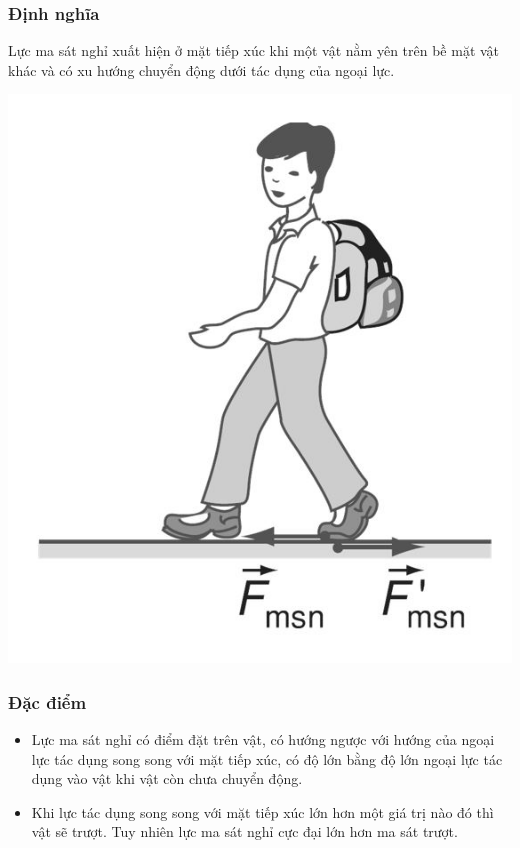 \subsubsection{Định nghĩa}
Lực ma sát nghỉ xuất hiện ở mặt tiếp xúc khi một vật nằm yên trên bề mặt
vật khác và có xu hướng chuyển động dưới tác dụng của ngoại lực.
\begin{center}
	\includegraphics[scale=0.35]{../figs/VN10-PH-15-L-012-1-V2-03.JPG}
\end{center}
\subsubsection{Đặc điểm}
\begin{itemize}
	\item Lực ma sát nghỉ có điểm đặt trên vật, có hướng ngược với hướng của ngoại lực tác dụng song song với mặt tiếp xúc, có độ lớn bằng độ lớn ngoại lực tác dụng vào vật khi vật còn chưa chuyển động.
	\item Khi lực tác dụng song song với mặt tiếp xúc lớn hơn một giá trị nào đó thì vật sẽ trượt. Tuy nhiên lực ma sát nghỉ cực đại lớn hơn ma sát trượt.
\end{itemize}
